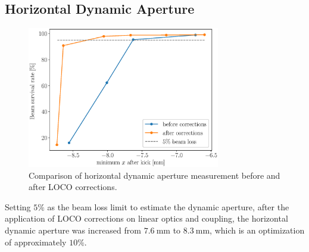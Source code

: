 \subsection{Horizontal Dynamic Aperture}
\begin{figure}
\centering
\includegraphics[width=0.75\textwidth]{figures/xdynamic_aperture.eps}
\caption{Comparison of horizontal dynamic aperture measurement before and after LOCO corrections.}
\label{fig:xdynap}
\end{figure}

Setting $5\%$ as the beam loss limit to estimate the dynamic aperture, after the application of LOCO corrections on linear optics and coupling, the horizontal dynamic aperture was increased from $\SI{7.6}{\milli\meter}$ to $\SI{8.3}{\milli\meter}$, which is an optimization of approximately $10\%$.






